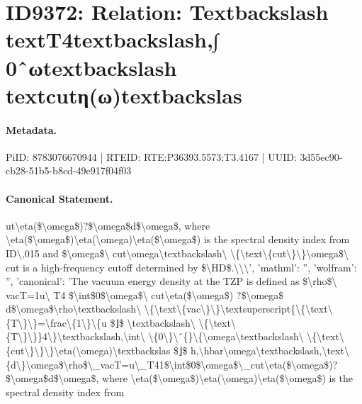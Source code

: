 \section*{ID9372: Relation: Textbackslash textT4textbackslash,∫ 0ˆωtextbackslash textcutη(ω)textbackslas}
\paragraph{Metadata.}
PiID: 8783076670944 | RTEID: RTE:P36393.5573:T3.4167 | UUID: 3d55ec90-cb28-51b5-b8cd-49e917f04f03

\paragraph{Canonical Statement.}
ut\textbackslash{}eta(\$\textbackslash{}omega\$)?\$\textbackslash{}omega\$d\$\textbackslash{}omega\$, where \textbackslash{}eta(\$\textbackslash{}omega\$)\textbackslash{}eta(\textbackslash{}omega)\textbackslash{}eta(\$\textbackslash{}omega\$) is the spectral density index from ID\textbackslash{},015 and \$\textbackslash{}omega\$\textbackslash{} cut\textbackslash{}omega\textbackslash{}textbackslash\textbackslash{} \textbackslash{}\{\textbackslash{}text\textbackslash{}\{cut\textbackslash{}\}\textbackslash{}\}\textbackslash{}omega\$\textbackslash{} cut is a high-frequency cutoff determined by \$\textbackslash{}HD\$.\textbackslash{}\textbackslash{}\textbackslash{}', 'mathml': '', 'wolfram': '', 'canonical': 'The vacuum energy density at the TZP is defined as \$\textbackslash{}rho\$\textbackslash{} vacT=1u\textbackslash{} T4 \$\textbackslash{}int\$0\$\textbackslash{}omega\$\textbackslash{} cut\textbackslash{}eta(\$\textbackslash{}omega\$) ?\$\textbackslash{}omega\$ d\$\textbackslash{}omega\$\textbackslash{}rho\textbackslash{}textbackslash\textbackslash{} \textbackslash{}\{\textbackslash{}text\textbackslash{}\{vac\textbackslash{}\}\textbackslash{}\}\textbackslash{}textsuperscript\{\textbackslash{}\{\textbackslash{}text\textbackslash{}\{T\textbackslash{}\}\textbackslash{}\}=\textbackslash{}frac\textbackslash{}\{1\textbackslash{}\}\textbackslash{}\{u \$⌋\$ \textbackslash{}textbackslash\textbackslash{} \textbackslash{}\{\textbackslash{}text\textbackslash{}\{T\textbackslash{}\}\textbackslash{}\}\}4\textbackslash{}\}\textbackslash{}textbackslash,\textbackslash{}int\textbackslash{} \textbackslash{}\{0\textbackslash{}\}\textbackslash{}ˆ\{\}\textbackslash{}\{\textbackslash{}omega\textbackslash{}textbackslash\textbackslash{} \textbackslash{}\{\textbackslash{}text\textbackslash{}\{cut\textbackslash{}\}\textbackslash{}\}\textbackslash{}\}\textbackslash{}eta(\textbackslash{}omega)\textbackslash{}textbackslas \$⌋\$ h,\textbackslash{}hbar\textbackslash{}omega\textbackslash{}textbackslash,\textbackslash{}text\textbackslash{}\{d\textbackslash{}\}\textbackslash{}omega\$\textbackslash{}rho\$\textbackslash{}\_vacT=u\textbackslash{}\_T41\$\textbackslash{}int\$0\$\textbackslash{}omega\$\textbackslash{}\_cut\textbackslash{}eta(\$\textbackslash{}omega\$)?\$\textbackslash{}omega\$d\$\textbackslash{}omega\$, where \textbackslash{}eta(\$\textbackslash{}omega\$)\textbackslash{}eta(\textbackslash{}omega)\textbackslash{}eta(\$\textbackslash{}omega\$) is the spectral density index from 